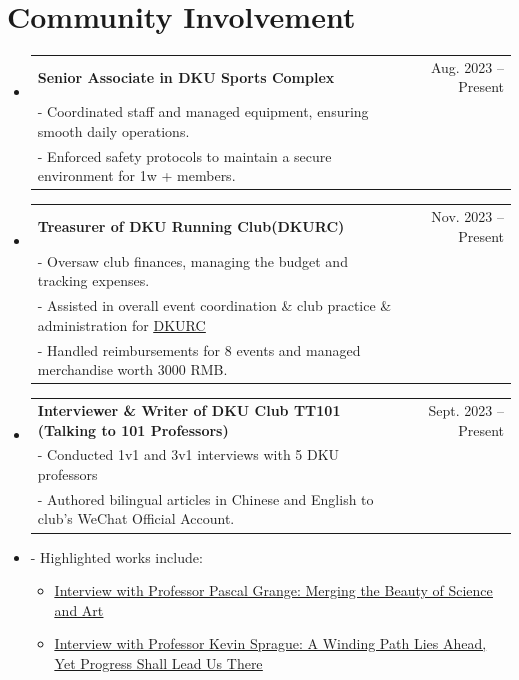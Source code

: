 \documentclass[letterpaper,11pt]{article}
\makeatletter
\newcommand{\CVItem}[1]{
  \item\small{
    {#1 \vspace{-2pt}}
  }
}
\newcommand{\CVSubheading}[4]{
  \vspace{-2pt}\item
    \begin{tabular*}{0.97\textwidth}[t]{l@{\extracolsep{\fill}}r}
      \textbf{#1} & #2 \\
      \small#3 & \small #4 \\
    \end{tabular*}\vspace{-7pt}
}
\newcommand{\CVSubHeadingListStart}{\begin{itemize}[leftmargin=0.5cm, label={}]}
\newcommand{\CVSubHeadingListEnd}{\end{itemize}}
\makeatother
\begin{document}
\section{Community Involvement}
  \CVSubHeadingListStart
    \CVSubheading
      {Senior Associate in DKU Sports Complex}{Aug. 2023 -- Present}
      {- Coordinated staff and managed equipment, ensuring smooth daily operations.\\
         - Enforced safety protocols to maintain a secure environment for 1w + members.}{}
    \CVSubheading
      {Treasurer of DKU Running Club(DKURC)}{Nov. 2023 -- Present}
      {- Oversaw club finances, managing the budget and tracking expenses.\\
         - Assisted in overall event coordination \& club practice \& administration for \href{https://sites.duke.edu/dkurunning/leadership/}{\underline{DKURC}}\\
         - Handled reimbursements for 8 events and managed merchandise worth 3000 RMB.}{}
    \CVSubheading
      {Interviewer \& Writer of DKU Club TT101 (Talking to 101 Professors)}{Sept. 2023 -- Present}
      {- Conducted 1v1 and 3v1 interviews with 5 DKU professors\\
        - Authored bilingual articles in Chinese and English to club's WeChat Official Account.}{}
        \CVItem{- Highlighted works include:}
          \begin{itemize}[left=2em, itemsep=2pt, parsep=2pt]
            \CVItem{\href{https://mp.weixin.qq.com/s/LriD9cSZHalxBJbugd_jXQ}{\underline{Interview with Professor Pascal Grange: Merging the Beauty of Science and Art}}}
            \CVItem{\href{https://mp.weixin.qq.com/s/ZeKLnIZEenoQfteYwf-mSw}{\underline{Interview with Professor Kevin Sprague: A Winding Path Lies Ahead, Yet Progress Shall Lead Us There}}}
            
          \end{itemize}
  \CVSubHeadingListEnd

\end{document}
